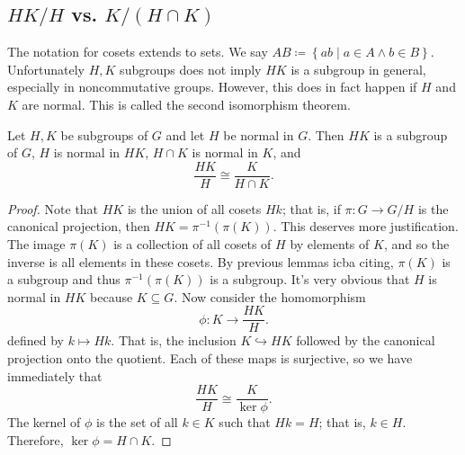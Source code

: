 \subsection{$HK /H$ vs. $K /(H\cap K)$}
The notation for cosets extends to sets. We say $AB\coloneqq \left\{ ab \mid a\in A\land b\in B \right\} $. Unfortunately $H,K$ subgroups does not imply $HK$ is a subgroup in general, especially in noncommutative groups. However, this does in fact happen if $H$ and $K$ are normal. This is called the second isomorphism theorem.
\begin{proposition}\label{prp:2.8.4}
	Let $H,K$ be subgroups of $G$ and let $H$ be normal in $G$. Then $HK$ is a subgroup of $G$, $H$ is normal in $HK$, $H\cap K$ is normal in $K$, and
	\[
		\frac{HK}{H}\cong \frac{K}{H\cap K}
	.\]
\end{proposition}
\begin{proof}
	Note that $HK$ is the union of all cosets $Hk$; that is, if $\pi : G \to G /H$ is the canonical projection, then $HK=\pi ^{-1}(\pi (K))$. This deserves more justification. The image $\pi (K)$ is a collection of all cosets of $H$ by elements of $K$, and so the inverse is all elements in these cosets. By previous lemmas icba citing, $\pi (K)$ is a subgroup and thus $\pi ^{-1}(\pi (K))$ is a subgroup. It's very obvious that $H$ is normal in $HK$ because $K\subseteq G$. Now consider the homomorphism
	\[
		\phi : K \to \frac{HK}{H}
	.\]
	defined by $k\mapsto Hk$. That is, the inclusion $K\hookrightarrow HK$ followed by the canonical projection onto the quotient. Each of these maps is surjective, so we have immediately that
	\[
		\frac{HK}{H}\cong \frac{K}{\ker \phi }
	.\]
	The kernel of $\phi $ is the set of all $k\in K$ such that $Hk=H$; that is, $k\in H$. Therefore, $\ker \phi =H\cap K$.
\end{proof}

